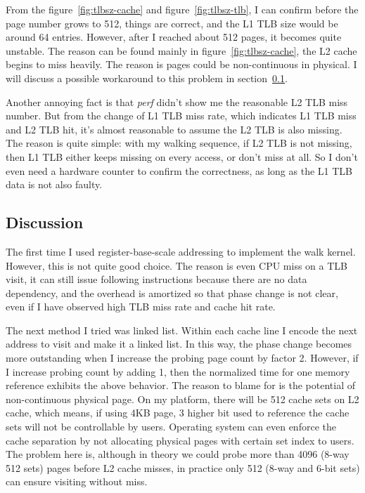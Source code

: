 From the figure~\ref{fig:tlbsz-cache} and figure~\ref{fig:tlbsz-tlb}, I can
confirm before the page number grows to 512, things are correct, and the
L1 TLB size would be around 64 entries. However, after I reached about 512
pages, it becomes quite unstable. The reason can be found mainly in
figure~\ref{fig:tlbsz-cache}, the L2 cache begins to miss heavily.  The reason
is pages could be non-continuous in physical. I will discuss a possible 
workaround to this problem in section~\ref{subsec:tlb-discus}.

Another annoying fact is that \emph{perf} didn't show me the reasonable L2 TLB
miss number. But from the change of L1 TLB miss rate, which indicates L1 TLB
miss and L2 TLB hit, it's almost reasonable to assume the L2 TLB is also
missing. The reason is quite simple: with my walking sequence, if L2 TLB is not
missing, then L1 TLB either keeps missing on every access, or don't miss at
all. So I don't even need a hardware counter to confirm the correctness, as
long as the L1 TLB data is not also faulty.

\subsection{Discussion}
\label{subsec:tlb-discus}
The first time I used register-base-scale addressing to implement the walk
kernel. However, this is not quite good choice. The reason is even CPU miss
on a TLB visit, it can still issue following instructions because there are
no data dependency, and the overhead is amortized so that phase change is
not clear, even if I have observed high TLB miss rate and cache hit rate.

The next method I tried was linked list. Within each cache line I encode the
next address to visit and make it a linked list. In this way, the phase change
becomes more outstanding when I increase the probing page count by factor 2.
However, if I increase probing count by adding 1, then the normalized time for
one memory reference exhibits the above behavior. The reason to blame for is
the potential of non-continuous physical page. On my platform, there will be
512 cache sets on L2 cache, which means, if using 4KB page, 3 higher bit used
to reference the cache sets will not be controllable by users. Operating system
can even enforce the cache separation by not allocating physical pages with
certain set index to users. The problem here is, although in theory we could
probe more than 4096 (8-way 512 sets) pages before L2 cache misses, in practice
only 512 (8-way and 6-bit sets) can ensure visiting without miss.

